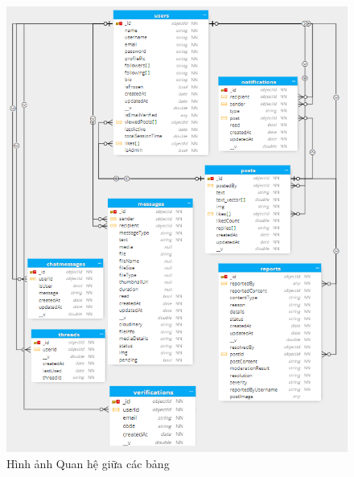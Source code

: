 \begin{figure}[H]
    \centering
    \includegraphics[width=1\textwidth]{image/MoHinh/13.png}
    \caption{Hình ảnh Quan hệ giữa các bảng}
    \label{fig:quan_he_giua_cac_banng}
\end{figure}
